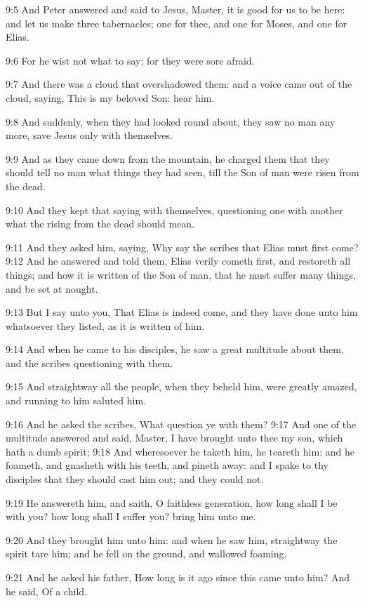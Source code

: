9:5 And Peter answered and said to Jesus, Master, it is good for us to
be here: and let us make three tabernacles; one for thee, and one for
Moses, and one for Elias.

9:6 For he wist not what to say; for they were sore afraid.

9:7 And there was a cloud that overshadowed them: and a voice came out
of the cloud, saying, This is my beloved Son: hear him.

9:8 And suddenly, when they had looked round about, they saw no man
any more, save Jesus only with themselves.

9:9 And as they came down from the mountain, he charged them that they
should tell no man what things they had seen, till the Son of man were
risen from the dead.

9:10 And they kept that saying with themselves, questioning one with
another what the rising from the dead should mean.

9:11 And they asked him, saying, Why say the scribes that Elias must
first come?  9:12 And he answered and told them, Elias verily cometh
first, and restoreth all things; and how it is written of the Son of
man, that he must suffer many things, and be set at nought.

9:13 But I say unto you, That Elias is indeed come, and they have done
unto him whatsoever they listed, as it is written of him.

9:14 And when he came to his disciples, he saw a great multitude about
them, and the scribes questioning with them.

9:15 And straightway all the people, when they beheld him, were
greatly amazed, and running to him saluted him.

9:16 And he asked the scribes, What question ye with them?  9:17 And
one of the multitude answered and said, Master, I have brought unto
thee my son, which hath a dumb spirit; 9:18 And wheresoever he taketh
him, he teareth him: and he foameth, and gnasheth with his teeth, and
pineth away: and I spake to thy disciples that they should cast him
out; and they could not.

9:19 He answereth him, and saith, O faithless generation, how long
shall I be with you? how long shall I suffer you? bring him unto me.

9:20 And they brought him unto him: and when he saw him, straightway
the spirit tare him; and he fell on the ground, and wallowed foaming.

9:21 And he asked his father, How long is it ago since this came unto
him?  And he said, Of a child.

